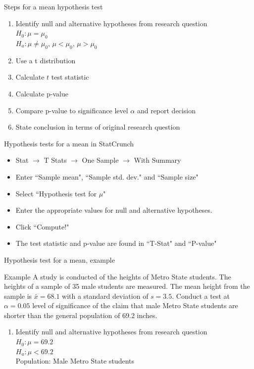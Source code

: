\documentclass[xcolor=table]{beamer}
\begin{document}
\begin{frame}{Steps for a mean hypothesis test}
\begin{block}{}
\large
\begin{enumerate}
\item Identify null and alternative hypotheses from research question\\
$H_0: \mu = \mu_0$\\
$H_a: \mu \ne \mu_0, \, \mu < \mu_0, \, \mu> \mu_0$
\item Use a t distribution
\item Calculate $t$ test statistic
\item Calculate p-value
\item Compare p-value to significance level $\alpha$ and report decision
\item State conclusion in terms of original research question
\end{enumerate}
\end{block}
\end{frame}

\begin{frame}{Hypothesis tests for a mean in StatCrunch}

\begin{block}{}
\large
\begin{itemize}
\item Stat $\to$ T Stats $\to$ One Sample $\to$ With Summary
\item Enter ``Sample mean", ``Sample std. dev." and ``Sample size"
\item Select ``Hypothesis test for $\mu$"
\item Enter the appropriate values for null and alternative hypotheses.
\item Click ``Compute!"
\item The test statistic and p-value are found in ``T-Stat" and ``P-value"
\end{itemize}
\end{block}

\end{frame}

\begin{frame}{Hypothesis test for a mean, example}
\begin{exampleblock}{Example}
\large
A study is conducted of the heights of Metro State students. The heights of a sample of 35 male students are measured. The mean height from the sample is $\bar x = 68.1$ with a standard deviation of $s=3.5$. Conduct a test at $\alpha=0.05$ level of significance of the claim that male Metro State students are shorter than the general population of 69.2 inches.
\begin{enumerate}
\pause\item Identify null and alternative hypotheses from research question\\
\pause$H_0: \mu = 69.2$\\
$H_a: \mu < 69.2$\\
Population: Male Metro State students
\end{enumerate}
\end{exampleblock}
\end{frame}
\end{document}
